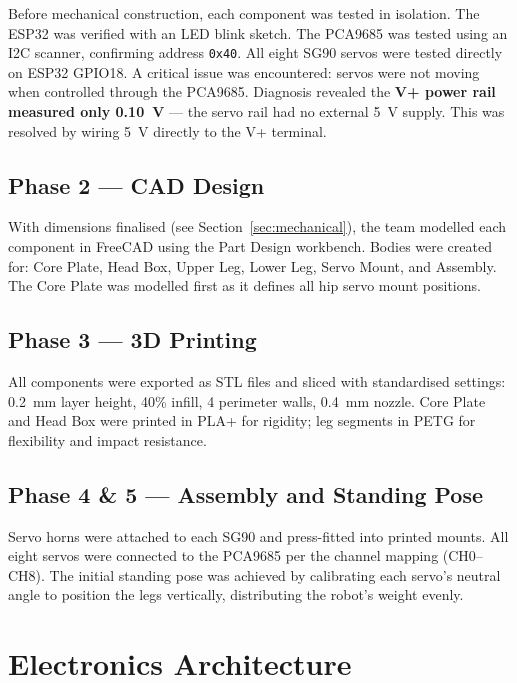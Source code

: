 \documentclass[12pt, a4paper]{article}
\begin{document}
Before mechanical construction, each component was tested in isolation. The ESP32
was verified with an LED blink sketch. The PCA9685 was tested using an I2C
scanner, confirming address \texttt{0x40}. All eight SG90 servos were tested
directly on ESP32 GPIO18. A critical issue was encountered: servos were not
moving when controlled through the PCA9685. Diagnosis revealed the
\textbf{V+ power rail measured only 0.10~V} --- the servo rail had no external
5~V supply. This was resolved by wiring 5~V directly to the V+ terminal.

\subsection{Phase 2 --- CAD Design}

With dimensions finalised (see Section~\ref{sec:mechanical}), the team modelled
each component in FreeCAD using the Part Design workbench. Bodies were created
for: Core Plate, Head Box, Upper Leg, Lower Leg, Servo Mount, and Assembly. The
Core Plate was modelled first as it defines all hip servo mount positions.

\subsection{Phase 3 --- 3D Printing}

All components were exported as STL files and sliced with standardised settings:
0.2~mm layer height, 40\% infill, 4 perimeter walls, 0.4~mm nozzle. Core Plate
and Head Box were printed in PLA+ for rigidity; leg segments in PETG for
flexibility and impact resistance.

\subsection{Phase 4 \& 5 --- Assembly and Standing Pose}

Servo horns were attached to each SG90 and press-fitted into printed mounts. All
eight servos were connected to the PCA9685 per the channel mapping (CH0--CH8).
The initial standing pose was achieved by calibrating each servo's neutral angle
to position the legs vertically, distributing the robot's weight evenly.

\clearpage
\section{Electronics Architecture}\label{sec:electronics}
\end{document}
